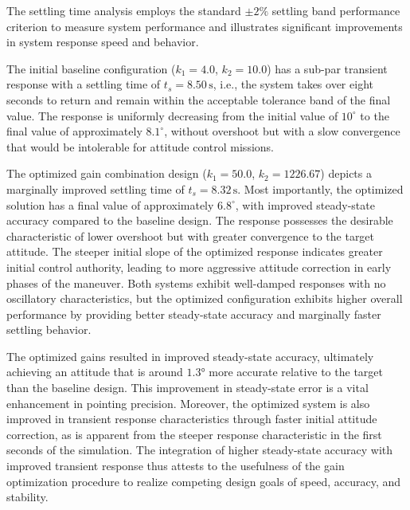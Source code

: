 \documentclass{ifacconf}
\begin{document}
 The settling time analysis employs the standard $\pm 2\%$ settling band performance criterion to measure system performance and illustrates significant improvements in system response speed and behavior. 

The initial baseline configuration ($k_1 = 4.0$, $k_2 = 10.0$) has a sub-par transient response with a settling time of $t_s = 8.50\,\text{s}$, i.e., the system takes over eight seconds to return and remain within the acceptable tolerance band of the final value. The response is uniformly decreasing from the initial value of $10^\circ$ to the final value of approximately $8.1^\circ$, without overshoot but with a slow convergence that would be intolerable for attitude control missions.

The optimized gain combination design ($k_1 = 50.0$, $k_2 = 1226.67$) depicts a marginally improved settling time of $t_s = 8.32\,\text{s}$. Most importantly, the optimized solution has a final value of approximately $6.8^\circ$, with improved steady-state accuracy compared to the baseline design. The response possesses the desirable characteristic of lower overshoot but with greater convergence to the target attitude. The steeper initial slope of the optimized response indicates greater initial control authority, leading to more aggressive attitude correction in early phases of the maneuver. Both systems exhibit well-damped responses with no oscillatory characteristics, but the optimized configuration exhibits higher overall performance by providing better steady-state accuracy and marginally faster settling behavior.

The optimized gains resulted in improved steady-state accuracy, ultimately achieving an attitude that is around $1.3°$ more accurate relative to the target than the baseline design. This improvement in steady-state error is a vital enhancement in pointing precision. Moreover, the optimized system is also improved in transient response characteristics through faster initial attitude correction, as is apparent from the steeper response characteristic in the first seconds of the simulation. The integration of higher steady-state accuracy with improved transient response thus attests to the usefulness of the gain optimization procedure to realize competing design goals of speed, accuracy, and stability.
\end{document}
